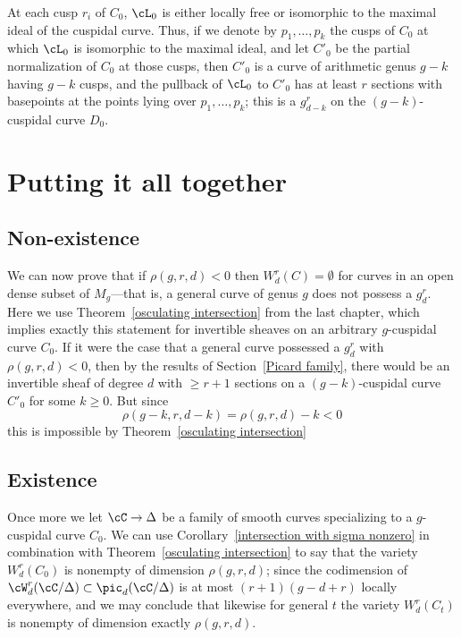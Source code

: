 At each cusp $r_i$ of $C_0$, $\cL_0$ is either locally free or isomorphic to the maximal ideal of the cuspidal curve. Thus, if we denote by $p_1,\dots, p_k$ the cusps of $C_0$ at which $\cL_0$ is isomorphic to the maximal ideal, and let $C'_{0}$ be the partial normalization of $C_0$ at those cusps, then $C'_{0}$ is a curve of arithmetic genus $g-k$ having $g-k$ cusps, and the pullback of $\cL_0$ to $C'_{0}$ has at least $r$ sections with basepoints at the points lying over $p_1,\dots,p_k$;  this is a $g^r_{d-k}$ on the $(g-k)$-cuspidal curve  $D_0$.



\section{Putting it all together}

\subsection{Non-existence}\label{nonexistence}

We can now prove that if $\rho(g,r,d) < 0$  then $W^{r}_{d}(C) = \emptyset$ for curves in an open dense subset of $M_{g}$---that is, a general curve of genus $g$ does not possess a $g^r_d$.
Here we use Theorem~\ref{osculating intersection} from the last chapter, which implies exactly this statement for invertible sheaves on an arbitrary $g$-cuspidal curve $C_0$. If it were the case that a general curve possessed a $g^r_d$ with $\rho(g,r,d) < 0$, then by the results of Section~\ref{Picard family}, there would be
 an invertible sheaf of degree $d$ with $\geq r+1$ sections on a $(g-k)$-cuspidal curve  $ C'_0$ for some $k \geq 0$. But since
$$
\rho(g-k, r, d-k) = \rho(g,r,d) - k < 0
$$
this is impossible by Theorem~\ref{osculating intersection}

\subsection{Existence}

Once more we let $\cC \to \Delta$ be a family of smooth curves specializing to a $g$-cuspidal curve $C_0$. We can use Corollary~\ref{intersection with sigma nonzero} in combination with Theorem~\ref{osculating intersection} to say that the variety $W^r_d(C_0)$ is nonempty of dimension $\rho(g,r,d)$; since the codimension of $\cW^r_d(\cC/\Delta) \subset \pic_d(\cC/\Delta)$ is at most $(r+1)(g-d+r)$ locally everywhere, and we may conclude that likewise for general $t$ the variety $W^r_d(C_t)$ is nonempty of dimension exactly $\rho(g,r,d)$. 

